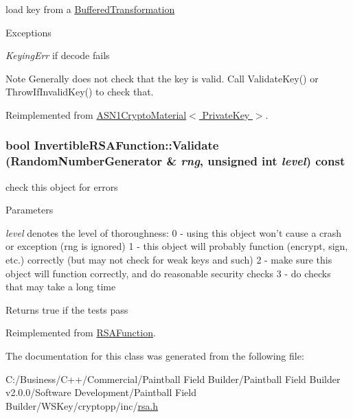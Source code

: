 load key from a \hyperlink{class_buffered_transformation}{BufferedTransformation} 
\begin{DoxyExceptions}{Exceptions}
\item[{\em KeyingErr}]if decode fails \end{DoxyExceptions}
\begin{DoxyNote}{Note}
Generally does not check that the key is valid. Call ValidateKey() or ThrowIfInvalidKey() to check that. 
\end{DoxyNote}


Reimplemented from \hyperlink{class_a_s_n1_crypto_material}{ASN1CryptoMaterial$<$ PrivateKey $>$}.\hypertarget{class_invertible_r_s_a_function_a35247205517f839220a16287917ce0ce}{
\subsubsection[{Validate}]{\setlength{\rightskip}{0pt plus 5cm}bool InvertibleRSAFunction::Validate ({\bf RandomNumberGenerator} \& {\em rng}, \/  unsigned int {\em level}) const}}
\label{class_invertible_r_s_a_function_a35247205517f839220a16287917ce0ce}


check this object for errors 
\begin{DoxyParams}{Parameters}
\item[{\em level}]denotes the level of thoroughness: 0 -\/ using this object won't cause a crash or exception (rng is ignored) 1 -\/ this object will probably function (encrypt, sign, etc.) correctly (but may not check for weak keys and such) 2 -\/ make sure this object will function correctly, and do reasonable security checks 3 -\/ do checks that may take a long time \end{DoxyParams}
\begin{DoxyReturn}{Returns}
true if the tests pass 
\end{DoxyReturn}


Reimplemented from \hyperlink{class_r_s_a_function_a469fec0f4772d178f8674c2a35f19c51}{RSAFunction}.

The documentation for this class was generated from the following file:\begin{DoxyCompactItemize}
\item 
C:/Business/C++/Commercial/Paintball Field Builder/Paintball Field Builder v2.0.0/Software Development/Paintball Field Builder/WSKey/cryptopp/inc/\hyperlink{rsa_8h}{rsa.h}\end{DoxyCompactItemize}
